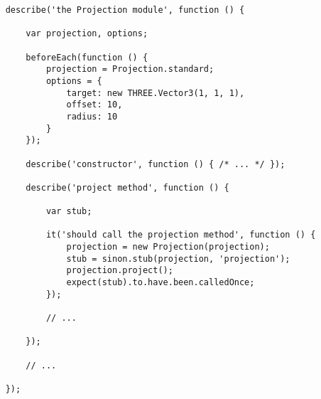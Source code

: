 \begin{lstlisting}
	describe('the Projection module', function () {

		var projection, options;

		beforeEach(function () {
			projection = Projection.standard;
			options = {
				target: new THREE.Vector3(1, 1, 1),
				offset: 10,
				radius: 10
			}
		});

		describe('constructor', function () { /* ... */ });

		describe('project method', function () {

			var stub;

			it('should call the projection method', function () {
				projection = new Projection(projection);
				stub = sinon.stub(projection, 'projection');
				projection.project();
				expect(stub).to.have.been.calledOnce;
			});

			// ...

		});

		// ...

	});
\end{lstlisting}
